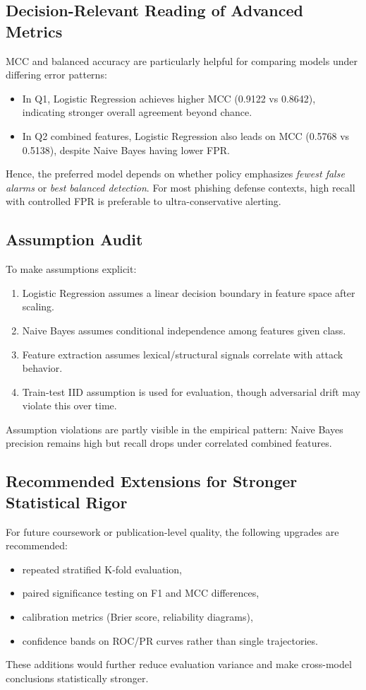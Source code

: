 \subsection{Decision-Relevant Reading of Advanced Metrics}

MCC and balanced accuracy are particularly helpful for comparing models under differing error patterns:
\begin{itemize}
    \item In Q1, Logistic Regression achieves higher MCC (0.9122 vs 0.8642), indicating stronger overall agreement beyond chance.
    \item In Q2 combined features, Logistic Regression also leads on MCC (0.5768 vs 0.5138), despite Naive Bayes having lower FPR.
\end{itemize}

Hence, the preferred model depends on whether policy emphasizes \emph{fewest false alarms} or \emph{best balanced detection}. For most phishing defense contexts, high recall with controlled FPR is preferable to ultra-conservative alerting.

\subsection{Assumption Audit}

To make assumptions explicit:
\begin{enumerate}
    \item Logistic Regression assumes a linear decision boundary in feature space after scaling.
    \item Naive Bayes assumes conditional independence among features given class.
    \item Feature extraction assumes lexical/structural signals correlate with attack behavior.
    \item Train-test IID assumption is used for evaluation, though adversarial drift may violate this over time.
\end{enumerate}

Assumption violations are partly visible in the empirical pattern: Naive Bayes precision remains high but recall drops under correlated combined features.

\subsection{Recommended Extensions for Stronger Statistical Rigor}

For future coursework or publication-level quality, the following upgrades are recommended:
\begin{itemize}
    \item repeated stratified K-fold evaluation,
    \item paired significance testing on F1 and MCC differences,
    \item calibration metrics (Brier score, reliability diagrams),
    \item confidence bands on ROC/PR curves rather than single trajectories.
\end{itemize}

These additions would further reduce evaluation variance and make cross-model conclusions statistically stronger.
